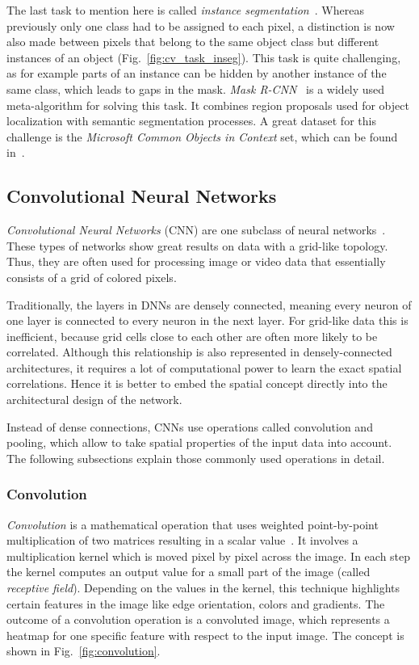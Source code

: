 The last task to mention here is called \emph{instance segmentation}~\cite{mask-rcnn14}. Whereas previously only one class had to be assigned to each pixel, a distinction is now also made between pixels that belong to the same object class but different instances of an object (Fig.~\ref{fig:cv_task_inseg}). This task is quite challenging, as for example parts of an instance can be hidden by another instance of the same class, which leads to gaps in the mask. \emph{Mask R-CNN}~\cite{mask-rcnn14} is a widely used meta-algorithm for solving this task. It combines region proposals used for object localization with semantic segmentation processes. A great dataset for this challenge is the \emph{Microsoft Common Objects in Context} set, which can be found in~\cite{coco14}.

\subsection{Convolutional Neural Networks}
\label{sec:cnn}
\emph{Convolutional Neural Networks} (CNN) are one subclass of neural networks~\cite[p.~359]{praxiseinstieg_ml17}. These types of networks show great results on data with a grid-like topology. Thus, they are often used for processing image or video data that essentially consists of a grid of colored pixels.

Traditionally, the layers in DNNs are densely connected, meaning every neuron of one layer is connected to every neuron in the next layer. For grid-like data this is inefficient, because grid cells close to each other are often more likely to be correlated. Although this relationship is also represented in densely-connected architectures, it requires a lot of computational power to learn the exact spatial correlations. Hence it is better to embed the spatial concept directly into the architectural design of the network.

Instead of dense connections, CNNs use operations called convolution and pooling, which allow to take spatial properties of the input data into account. The following subsections explain those commonly used operations in detail.

\subsubsection{Convolution}
\label{sec:convolution}
\emph{Convolution} is a mathematical operation that uses weighted point-by-point multiplication of two matrices resulting in a scalar value~\cite[p.~361f]{praxiseinstieg_ml17}. It involves a multiplication kernel which is moved pixel by pixel across the image. In each step the kernel computes an output value for a small part of the image (called \emph{receptive field}). Depending on the values in the kernel, this technique highlights certain features in the image like edge orientation, colors and gradients. The outcome of a convolution operation is a convoluted image, which represents a heatmap for one specific feature with respect to the input image. The concept is shown in Fig.~\ref{fig:convolution}.

